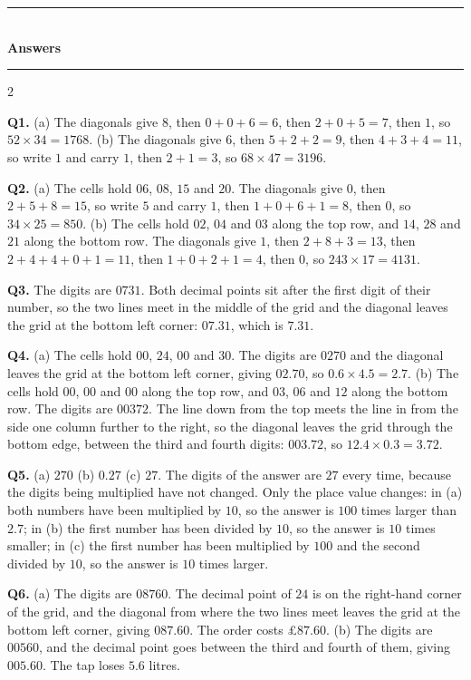 \documentclass[12pt,a4paper]{article}
\newcommand{\heading}[1]{%
  \vspace{2pt}
  {\color{blue!45!black}\rule{\linewidth}{1pt}}\\[1pt]
  {\large\bfseries #1}\\[-6pt]
  {\color{blue!45!black}\rule{\linewidth}{0.4pt}}
  \vspace{2pt}}
\begin{document}
\newpage

\heading{Answers}

{\small
\begin{multicols}{2}
\raggedcolumns
\setlength{\parskip}{4pt}

\textbf{Q1.} (a) The diagonals give $8$, then $0+0+6=6$, then $2+0+5=7$, then
$1$, so $52\times34=1768$. \quad
(b) The diagonals give $6$, then $5+2+2=9$, then $4+3+4=11$, so write $1$ and
carry $1$, then $2+1=3$, so $68\times47=3196$.

\textbf{Q2.} (a) The cells hold $06$, $08$, $15$ and $20$. The diagonals give
$0$, then $2+5+8=15$, so write $5$ and carry $1$, then $1+0+6+1=8$, then $0$,
so $34\times25=850$. \quad
(b) The cells hold $02$, $04$ and $03$ along the top row, and $14$, $28$ and
$21$ along the bottom row. The diagonals give $1$, then $2+8+3=13$, then
$2+4+4+0+1=11$, then $1+0+2+1=4$, then $0$, so $243\times17=4131$.

\textbf{Q3.} The digits are $0731$. Both decimal points sit after the first
digit of their number, so the two lines meet in the middle of the grid and the
diagonal leaves the grid at the bottom left corner: $07.31$, which is $7.31$.

\textbf{Q4.} (a) The cells hold $00$, $24$, $00$ and $30$. The digits are
$0270$ and the diagonal leaves the grid at the bottom left corner, giving
$02.70$, so $0.6\times4.5=2.7$. \quad
(b) The cells hold $00$, $00$ and $00$ along the top row, and $03$, $06$ and
$12$ along the bottom row. The digits are $00372$. The line down from the top
meets the line in from the side one column further to the right, so the
diagonal leaves the grid through the bottom edge, between the third and fourth
digits: $003.72$, so $12.4\times0.3=3.72$.

\textbf{Q5.} (a) $270$ \quad (b) $0.27$ \quad (c) $27$. The digits of the
answer are $27$ every time, because the digits being multiplied have not
changed. Only the place value changes: in (a) both numbers have been multiplied
by $10$, so the answer is $100$ times larger than $2.7$; in (b) the first
number has been divided by $10$, so the answer is $10$ times smaller; in (c)
the first number has been multiplied by $100$ and the second divided by $10$,
so the answer is $10$ times larger.

\textbf{Q6.} (a) The digits are $08760$. The decimal point of $24$ is on the
right-hand corner of the grid, and the diagonal from where the two lines meet
leaves the grid at the bottom left corner, giving $087.60$. The order costs
\pounds$87.60$. \quad
(b) The digits are $00560$, and the decimal point goes between the third and
fourth of them, giving $005.60$. The tap loses $5.6$ litres.


\end{multicols}}
\end{document}
